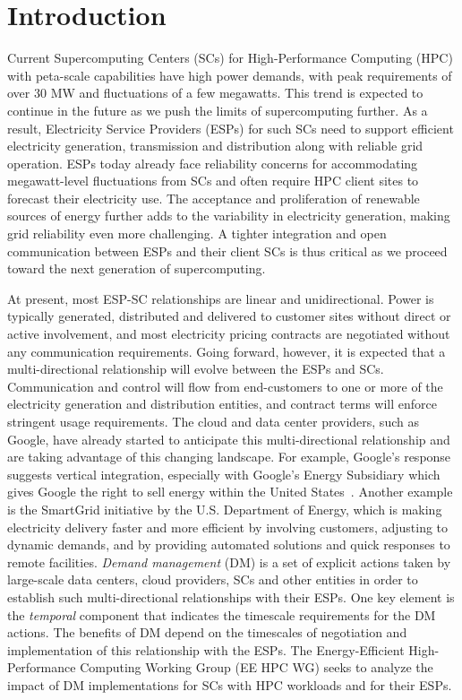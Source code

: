 \section{Introduction}
\label{intro}

Current Supercomputing Centers (SCs) for High-Performance Computing (HPC) with peta-scale capabilities have high power demands, with peak requirements of over 30 MW and fluctuations of a few megawatts. This trend is expected to continue in the future as we push the limits of supercomputing further. As a result, Electricity Service Providers (ESPs) for such SCs need to support efficient electricity generation, transmission and distribution along with reliable grid operation. ESPs today already face reliability concerns for accommodating megawatt-level fluctuations from SCs and often require HPC client sites to forecast their electricity use. The acceptance and proliferation of renewable sources of energy further adds to the variability in electricity generation, making grid reliability even more challenging. A tighter integration and open communication between ESPs and their client SCs is thus critical as we proceed toward the next generation of supercomputing. 

At present, most ESP-SC relationships are linear and unidirectional. Power is typically generated, distributed and delivered to customer sites without direct or active involvement, and most electricity pricing contracts are negotiated without any communication requirements. Going forward, however, it is expected that a multi-directional relationship will evolve between the ESPs and SCs.  Communication and control will flow from end-customers to one or more of the electricity generation and distribution entities, and contract terms will enforce stringent usage requirements. The cloud and data center providers, such as Google, have already started to anticipate this multi-directional relationship and are taking advantage of this changing landscape.  For example, Google's response suggests vertical integration, especially with Google's Energy Subsidiary which gives Google the right to sell energy within the United States~\cite{GoogleAdv}. Another example is the SmartGrid initiative \cite{SmartGrid} by the U.S. Department of Energy, which is making electricity delivery faster and more efficient by involving customers, adjusting to dynamic demands, and by providing automated solutions and quick responses to remote facilities. \emph{Demand management} (DM) is a set of explicit actions taken by large-scale data centers, cloud providers, SCs and other entities in order to establish such multi-directional relationships with their ESPs. One key element is the \emph{temporal} component that indicates the timescale requirements for the DM actions. The benefits of DM depend on the timescales of negotiation and implementation of this relationship with the ESPs. The Energy-Efficient High-Performance Computing Working Group (EE HPC WG) seeks to analyze the impact of DM implementations for SCs with HPC workloads and for their ESPs. 

